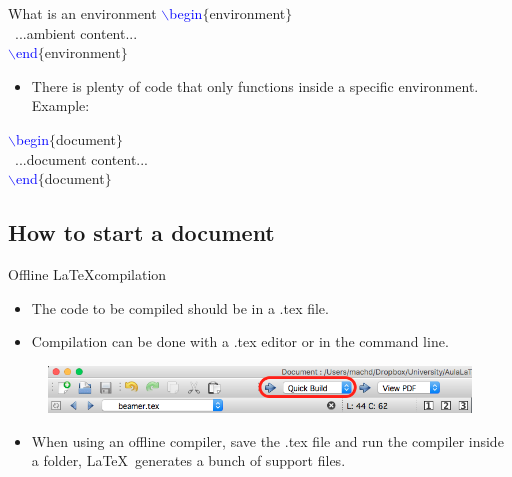 \documentclass[usenames,dvipsnames,aspectratio=169]{beamer}
\newcommand{\aitem}{\item[$\cdot$]}
\begin{document}

\begin{frame}[t]{What is an environment}
\textcolor{blue}{$\backslash$begin}\textcolor{PineGreen}{$\{$environment$\}$}\\
~...ambient content...\\
\textcolor{blue}{$\backslash$end}\textcolor{PineGreen}{$\{$environment$\}$}
\begin{itemize}
\aitem There is plenty of code that only functions inside a specific environment. Example:
\end{itemize}
\textcolor{blue}{$\backslash$begin}\textcolor{PineGreen}{$\{$document$\}$}\\
~...document content...\\
\textcolor{blue}{$\backslash$end}\textcolor{PineGreen}{$\{$document$\}$}
\end{frame}


\subsection{How to start a document}
\begin{frame}[t]{Offline \LaTeX compilation}
\begin{itemize}
\aitem The code to be compiled should be in a .tex file. 
\aitem Compilation can be done with a .tex editor or in the command line.
\end{itemize}
\begin{figure}
\includegraphics[width=\linewidth]{compilar.png}
\end{figure}
\begin{itemize}
\aitem When using an offline compiler, save the .tex file and run the compiler inside a folder, \LaTeX~generates a bunch of support files.
\end{itemize}
\end{frame}
\end{document}
